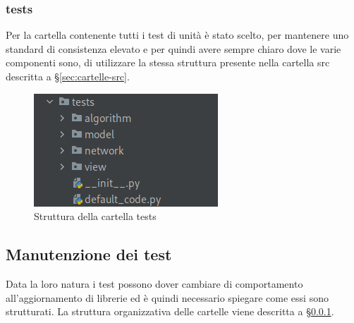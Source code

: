 \subsubsection{tests} \label{sec:cartelle-tests}
Per la cartella contenente tutti i test di unità è stato scelto, per mantenere uno standard di consistenza elevato e per quindi avere sempre chiaro dove le varie componenti sono, di utilizzare la stessa struttura presente nella cartella src descritta a \S{}\ref{sec:cartelle-src}.
\begin{figure}[H]
    \centering
    \includegraphics[scale = 0.5]{components/img/struttura-cartella-tests.png}
    \caption{Struttura della cartella tests}
    \label{fig:Struttura della cartella tests}
\end{figure}

\subsection{Manutenzione dei test}
Data la loro natura i test possono dover cambiare di comportamento all'aggiornamento di librerie ed è quindi necessario spiegare come essi sono strutturati. La struttura organizzativa delle cartelle viene descritta a \S{}\ref{sec:cartelle-tests}.
